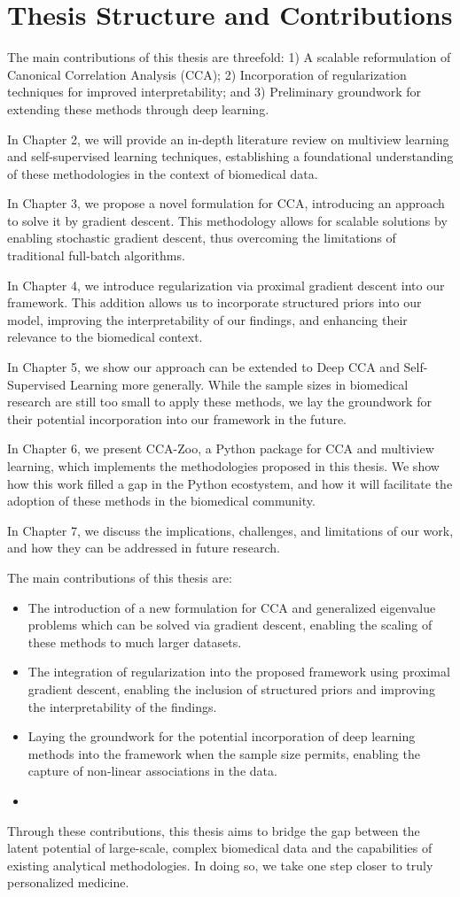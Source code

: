 \section{Thesis Structure and Contributions}

The main contributions of this thesis are threefold: 1) A scalable reformulation of Canonical Correlation Analysis (CCA); 2) Incorporation of regularization techniques for improved interpretability; and 3) Preliminary groundwork for extending these methods through deep learning.

In Chapter 2, we will provide an in-depth literature review on multiview learning and self-supervised learning techniques, establishing a foundational understanding of these methodologies in the context of biomedical data.

In Chapter 3, we propose a novel formulation for CCA, introducing an approach to solve it by gradient descent. This methodology allows for scalable solutions by enabling stochastic gradient descent, thus overcoming the limitations of traditional full-batch algorithms.

In Chapter 4, we introduce regularization via proximal gradient descent into our framework. This addition allows us to incorporate structured priors into our model, improving the interpretability of our findings, and enhancing their relevance to the biomedical context.

In Chapter 5, we show our approach can be extended to Deep CCA and Self-Supervised Learning more generally. While the sample sizes in biomedical research are still too small to apply these methods, we lay the groundwork for their potential incorporation into our framework in the future.

In Chapter 6, we present CCA-Zoo, a Python package for CCA and multiview learning, which implements the methodologies proposed in this thesis. We show how this work filled a gap in the Python ecostystem, and how it will facilitate the adoption of these methods in the biomedical community.

In Chapter 7, we discuss the implications, challenges, and limitations of our work, and how they can be addressed in future research.

The main contributions of this thesis are:

\begin{itemize}
    \item The introduction of a new formulation for CCA and generalized eigenvalue problems which can be solved via gradient descent, enabling the scaling of these methods to much larger datasets.
    \item The integration of regularization into the proposed framework using proximal gradient descent, enabling the inclusion of structured priors and improving the interpretability of the findings.
    \item Laying the groundwork for the potential incorporation of deep learning methods into the framework when the sample size permits, enabling the capture of non-linear associations in the data.
    \item
\end{itemize}

Through these contributions, this thesis aims to bridge the gap between the latent potential of large-scale, complex biomedical data and the capabilities of existing analytical methodologies.
In doing so, we take one step closer to truly personalized medicine.
